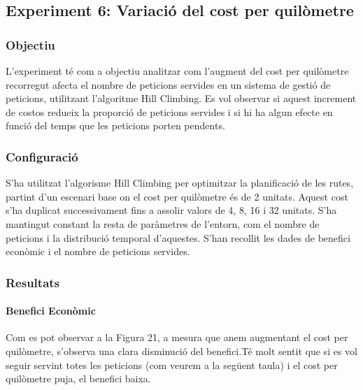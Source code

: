 
\subsection{Experiment 6: Variació del cost per quilòmetre}

\vspace{0.5cm}


\subsubsection{Objectiu}
L'experiment té com a objectiu analitzar com l'augment del cost per quilòmetre recorregut afecta el nombre de peticions servides en un sistema de gestió de peticions, utilitzant l'algoritme Hill Climbing. Es vol observar si aquest increment de costos redueix la proporció de peticions servides i si hi ha algun efecte en funció del temps que les peticions porten pendents.

\vspace{0.5cm}


\subsubsection{Configuració}
S'ha utilitzat l'algorisme Hill Climbing per optimitzar la planificació de les rutes, partint d'un escenari base on el cost per quilòmetre és de 2 unitats. Aquest cost s'ha duplicat successivament fins a assolir valors de 4, 8, 16 i 32 unitats. S'ha mantingut constant la resta de paràmetres de l'entorn, com el nombre de peticions i la distribució temporal d'aquestes. S'han recollit les dades de benefici econòmic i el nombre de peticions servides.

\vspace{0.5cm}


\subsubsection{Resultats}

\paragraph{Benefici Econòmic}
Com es pot observar a la Figura 21, a mesura que anem augmentant el cost per quilòmetre, s'observa una clara disminució del benefici.Té molt sentit que si es vol seguir servint totes les peticions (com veurem a la següent taula) i el cost per quilòmetre puja, el benefici baixa.



